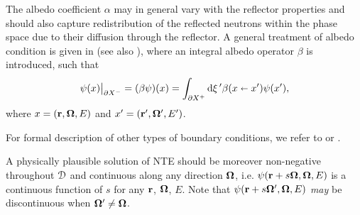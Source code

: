 \begin{remark}
	The albedo coefficient $\alpha$ may in general vary with the reflector properties and should also capture 
	redistribution of the reflected neutrons within the phase space due to their diffusion through the reflector. A general
	treatment of albedo condition is given in \cite{Sanchez4} (see also \cite{Sanchez3}), where an integral albedo operator
	$\beta$ is introduced, such that
\begin{equation}\label{eq:albedo-general}
	\angflux(x)\big\vert_{\pX[-]} = (\beta\angflux)(x) = \bndint[']{\pX[+]}\beta(x\sla x')\angflux(x'),
\end{equation}
	where $x = (\br,\bomega,E)$ and $x' = (\br',\bomega',E')$. 
\end{remark}
For formal description of other types of boundary conditions, we refer to \cite{Sanchez4} or \cite[Sec. 1.3]{Agoshkov}.

A physically plausible solution of NTE should be moreover non-negative throughout $\VV$ and continuous along any
direction $\bomega$, i.e. $\psi(\br + s\bomega,\bomega,E)$ is a continuous function of $s$ for any $\br$, $\bomega$, $E$. Note
that $\psi(\br + s\bomega',\bomega,E)$ \textsl{may} be discontinuous when $\bomega' \neq \bomega$.

